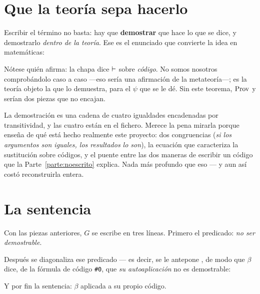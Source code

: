\section{Que la teoría sepa hacerlo}

Escribir el término no basta: hay que \textbf{demostrar} que hace lo que se dice, y demostrarlo
\emph{dentro de la teoría}. Ese es el enunciado que convierte la idea en matemáticas:



Nótese quién afirma: la chapa dice $\vdash$ sobre \emph{código}. No somos nosotros comprobándolo
caso a caso —eso sería una afirmación de la metateoría—; es la teoría objeto la que lo demuestra,
para el $\psi$ que se le dé. Sin este teorema, $\operatorname{Prov}$ y  serían dos piezas que no
encajan.

\begin{observacion}
La demostración es una cadena de cuatro igualdades encadenadas por transitividad, y las cuatro
están en el fichero. Merece la pena mirarla porque enseña de qué está hecho realmente este
proyecto: dos congruencias (\emph{si los argumentos son iguales, los resultados lo son}), la
ecuación que caracteriza la sustitución sobre códigos, y el puente entre las dos maneras de
escribir un código que la Parte~\ref{parte:noescrito} explica. Nada más profundo que eso — y aun
así costó reconstruirla entera.
\end{observacion}

\section{La sentencia}

Con las piezas anteriores, $G$ se escribe en tres líneas. Primero el predicado: \emph{no ser
demostrable}.


Después se diagonaliza ese predicado — es decir, se le antepone , de modo que
$\beta$ dice, de la fórmula de código \texttt{\#0}, que \emph{su autoaplicación} no es demostrable:


Y por fin la sentencia: $\beta$ aplicada a su propio código.


